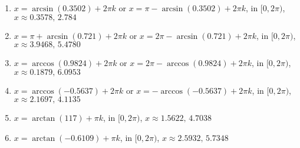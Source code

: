 \begin{enumerate}
\item $x = \arcsin(0.3502) + 2\pi k$ or $x = \pi - \arcsin(0.3502) + 2\pi k$, in  $[0, 2\pi)$, $x \approx 0.3578, \,2.784$

\item $x = \pi + \arcsin(0.721) + 2\pi k$ or $x = 2\pi - \arcsin(0.721) + 2\pi k$, in  $[0, 2\pi)$, $x \approx 3.9468, \, 5.4780$

\item $x = \arccos(0.9824) + 2\pi k$ or $x = 2\pi - \arccos(0.9824) + 2\pi k$, in  $[0, 2\pi)$, $x \approx 0.1879, \, 6.0953$

\item $x = \arccos(-0.5637) + 2\pi k$ or $x = - \arccos(-0.5637)  + 2\pi k$, in  $[0, 2\pi)$, $x \approx 2.1697, \, 4.1135$

\item $x = \arctan(117) + \pi k$, in  $[0, 2\pi)$, $x \approx 1.5622, \, 4.7038$

\item $x =  \arctan(-0.6109) + \pi k$, in  $[0, 2\pi)$, $x \approx 2.5932, \, 5.7348$

\setcounter{HW}{\value{enumi}}

\end{enumerate}

